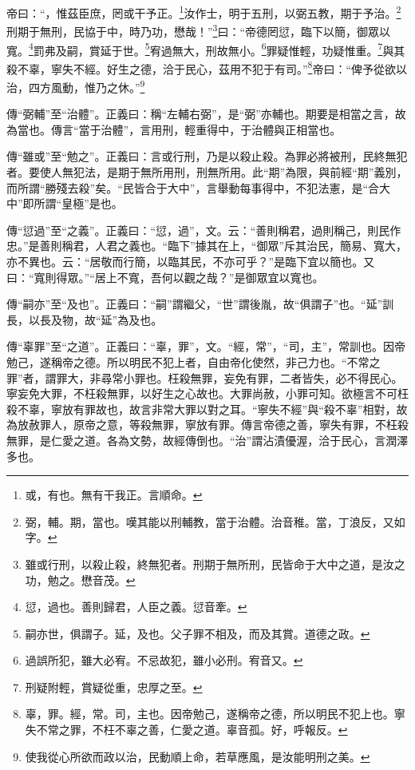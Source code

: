 帝曰：“，惟茲臣庶，罔或干予正。\footnote{或，有也。無有干我正。言順命。}汝作士，明于五刑，以弼五教，期于予治。\footnote{弼，輔。期，當也。嘆其能以刑輔教，當于治體。治音稚。當，丁浪反，又如字。}刑期于無刑，民協于中，時乃功，懋哉！”\footnote{雖或行刑，以殺止殺，終無犯者。刑期于無所刑，民皆命于大中之道，是汝之功，勉之。懋音茂。}曰：“帝德罔愆，臨下以簡，御眾以寬。\footnote{愆，過也。善則歸君，人臣之義。愆音牽。}罰弗及嗣，賞延于世。\footnote{嗣亦世，俱謂子。延，及也。父子罪不相及，而及其賞。道德之政。}宥過無大，刑故無小。\footnote{過誤所犯，雖大必宥。不忌故犯，雖小必刑。宥音又。}罪疑惟輕，功疑惟重。\footnote{刑疑附輕，賞疑從重，忠厚之至。}與其殺不辜，寧失不經。好生之德，洽于民心，茲用不犯于有司。”\footnote{辜，罪。經，常。司，主也。因帝勉己，遂稱帝之德，所以明民不犯上也。寧失不常之罪，不枉不辜之善，仁愛之道。辜音孤。好，呼報反。}帝曰：“俾予從欲以治，四方風動，惟乃之休。”\footnote{使我從心所欲而政以治，民動順上命，若草應風，是汝能明刑之美。}

{\noindent\zhuan{}\fzbyks 傳“弼輔”至“治體”。正義曰：稱“左輔右弼”，是“弼”亦輔也。期要是相當之言，故為當也。傳言“當于治體”，言用刑，輕重得中，于治體與正相當也。 \par}

{\noindent\zhuan{}\fzbyks 傳“雖或”至“勉之”。正義曰：言或行刑，乃是以殺止殺。為罪必將被刑，民終無犯者。要使人無犯法，是期于無所用刑，刑無所用。此“期”為限，與前經“期”義別，而所謂“勝殘去殺”矣。“民皆合于大中”，言舉動每事得中，不犯法憲，是“合大中”即所謂“皇極”是也。 \par}

{\noindent\zhuan{}\fzbyks 傳“愆過”至“之義”。正義曰：“愆，過”，文。云：“善則稱君，過則稱己，則民作忠。”是善則稱君，人君之義也。“臨下”據其在上，“御眾”斥其治民，簡易、寬大，亦不異也。云：“居敬而行簡，以臨其民，不亦可乎？”是臨下宜以簡也。又曰：“寬則得眾。”“居上不寬，吾何以觀之哉？”是御眾宜以寬也。 \par}

{\noindent\zhuan{}\fzbyks 傳“嗣亦”至“及也”。正義曰：“嗣”謂繼父，“世”謂後胤，故“俱謂子”也。“延”訓長，以長及物，故“延”為及也。 \par}

{\noindent\zhuan{}\fzbyks 傳“辜罪”至“之道”。正義曰：“辜，罪”，文。“經，常”，“司，主”，常訓也。因帝勉己，遂稱帝之德。所以明民不犯上者，自由帝化使然，非己力也。“不常之罪”者，謂罪大，非尋常小罪也。枉殺無罪，妄免有罪，二者皆失，必不得民心。寧妄免大罪，不枉殺無罪，以好生之心故也。大罪尚赦，小罪可知。欲極言不可枉殺不辜，寧放有罪故也，故言非常大罪以對之耳。“寧失不經”與“殺不辜”相對，故為放赦罪人，原帝之意，等殺無罪，寧放有罪。傳言帝德之善，寧失有罪，不枉殺無罪，是仁愛之道。各為文勢，故經傳倒也。“治”謂沾漬優渥，洽于民心，言潤澤多也。 \par}

